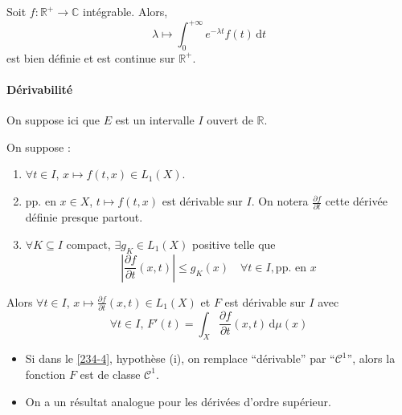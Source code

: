 
	\begin{example}
		Soit $f : \mathbb{R}^+ \rightarrow \mathbb{C}$ intégrable. Alors,
		\[ \lambda \mapsto \int_0^{+\infty} e^{-\lambda t} f(t) \, \mathrm{d}t \]
		est bien définie et est continue sur $\mathbb{R}^+$.
	\end{example}

	\paragraph{Dérivabilité}


	On suppose ici que $E$ est un intervalle $I$ ouvert de $\mathbb{R}$.

	\begin{theorem}
		\label{234-4}
		On suppose :
		\begin{enumerate}[label=(\roman*)]
			\item $\forall t \in I$, $x \mapsto f(t,x) \in L_1(X)$.
			\item pp. en $x \in X$, $t \mapsto f(t,x)$ est dérivable sur $I$. On notera $\frac{\partial f}{\partial t}$ cette dérivée définie presque partout.
			\item $\forall K \subseteq I$ compact, $\exists g_K \in L_1(X)$ positive telle que
			\[ \left| \frac{\partial f}{\partial t}(x,t) \right| \leq g_K(x) \quad \forall t \in I, \text{pp. en } x \]
		\end{enumerate}
		Alors $\forall t \in I$, $x \mapsto \frac{\partial f}{\partial t}(x, t) \in L_1(X)$ et $F$ est dérivable sur $I$ avec
		\[ \forall t \in I, \, F'(t) = \int_X \frac{\partial f}{\partial t}(x, t) \, \mathrm{d}\mu(x) \]
	\end{theorem}

	\begin{remark}
		\begin{itemize}
			\item Si dans le \cref{234-4}, hypothèse (i), on remplace ``dérivable'' par ``$\mathcal{C}^1$'', alors la fonction $F$ est de classe $\mathcal{C}^1$.
			\item On a un résultat analogue pour les dérivées d'ordre supérieur.
		\end{itemize}
	\end{remark}

